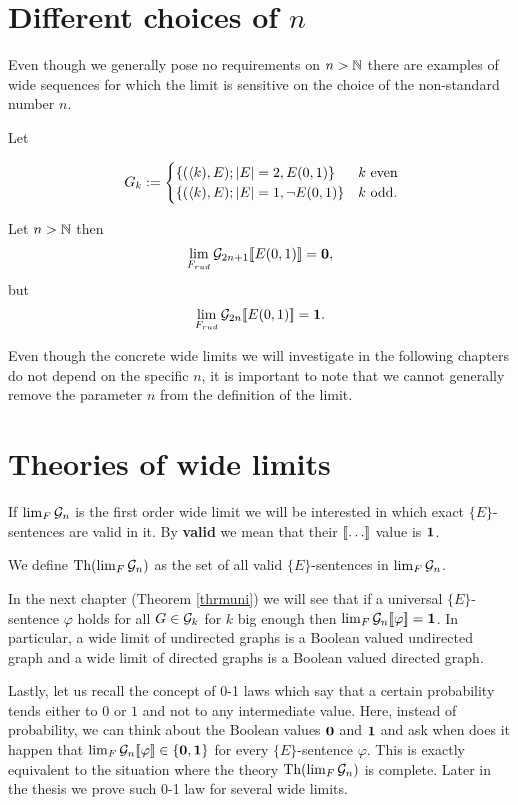 \section{Different choices of \texorpdfstring{$n$}{n}}

Even though we generally pose no requirements on $n>\mathbb{N}$ there are examples of wide sequences for which the limit is sensitive on the choice of the non-standard number $n$. 

\begin{exam}
Let 

\[\
G_{k}:=
\begin{cases}
\{(\langle k),E);\left|{E}\right|=2,E(0,1)\}&\text{$k$ even}\\
\{(\langle k),E);\left|{E}\right|=1,\lnot E(0,1)\}&\text{$k$ odd.}\\
\end{cases}\]

Let $n>\mathbb{N}$ then
\begin{align}
\lim_{F_{rud}}\mathcal{G}_{2n+1} [\![ E(0,1)]\!] =\textbf{0},
\end{align}
but
\begin{align}
\lim_{F_{rud}}\mathcal{G}_{2n}[\![ E(0,1)]\!]=\textbf{1}.
\end{align}

Even though the concrete wide limits we will investigate in the following chapters do not depend on the specific $n$, it is important to note that we cannot generally remove the parameter $n$ from the definition of the limit.
\end{exam}

\section{Theories of wide limits}

If $\lim_F\mathcal{G}_n$ is the first order wide limit we will be interested in which exact $\{E\}$-sentences are valid in it. By \textbf{valid} we mean that their $\bbl\dots\bbr$ value is $\textbf{1}$.

\begin{defi}
We define $\text{Th}(\lim_F\mathcal{G}_n)$ as the set of all valid $\{E\}$-sentences in $\lim_{F}\mathcal{G}_n$.
\end{defi}

In the next chapter (Theorem \ref{thrmuni}) we will see that if a universal $\{E\}$-sentence $\varphi$ holds for all $G\in\mathcal{G}_k$ for $k$ big enough then $\lim_F\mathcal{G}_n[\![\varphi]\!]=\textbf{1}$. In particular, a wide limit of undirected graphs is a Boolean valued undirected graph and a wide limit of directed graphs is a Boolean valued directed graph.

Lastly, let us recall the concept of 0-1 laws which say that a certain probability tends either to $0$ or $1$ and not to any intermediate value. Here, instead of probability, we can think about the Boolean values $\textbf{0}$ and $\textbf{1}$ and ask when does it happen that $\lim_F\mathcal{G}_n[\![\varphi]\!]\in\{\textbf{0},\textbf{1}\}$ for every $\{E\}$-sentence $\varphi$. This is exactly equivalent to the situation where the theory $\text{Th}(\lim_F \mathcal{G}_n)$ is complete. Later in the thesis we prove such 0-1 law for several wide limits.
